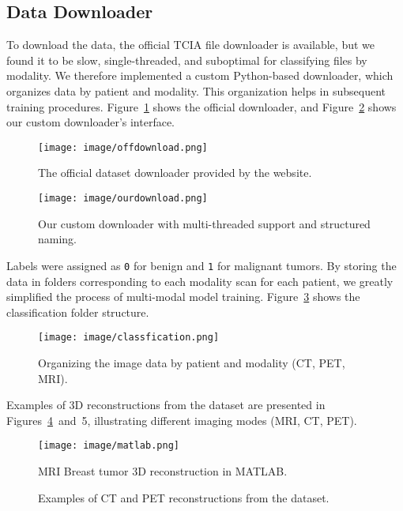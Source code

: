 \documentclass{article}
\begin{document}
\subsection{Data Downloader}
To download the data, the official TCIA file downloader is available, but we found it to be slow, single-threaded, and suboptimal for classifying files by modality. We therefore implemented a custom Python-based downloader, which organizes data by patient and modality. This organization helps in subsequent training procedures. Figure~\ref{fig:odown} shows the official downloader, and Figure~\ref{fig:ourdown} shows our custom downloader’s interface.

\begin{figure}[H]
\centering
\texttt{[image: image/offdownload.png]}
\caption{The official dataset downloader provided by the website.}
\label{fig:odown}
\end{figure}

\begin{figure}[H]
\centering
\texttt{[image: image/ourdownload.png]}
\caption{Our custom downloader with multi-threaded support and structured naming.}
\label{fig:ourdown}
\end{figure}

Labels were assigned as \texttt{0} for benign and \texttt{1} for malignant tumors. By storing the data in folders corresponding to each modality scan for each patient, we greatly simplified the process of multi-modal model training. Figure~\ref{fig:ourclass} shows the classification folder structure.

\begin{figure}[H]
\centering
\texttt{[image: image/classfication.png]}
\caption{Organizing the image data by patient and modality (CT, PET, MRI).}
\label{fig:ourclass}
\end{figure}

Examples of 3D reconstructions from the dataset are presented in Figures~\ref{fig:matlab}~and~5, illustrating different imaging modes (MRI, CT, PET). 

\begin{figure}[H]
\centering
\texttt{[image: image/matlab.png]}
\caption{MRI Breast tumor 3D reconstruction in MATLAB.}
\label{fig:matlab}
\end{figure}

\begin{figure}[H]
    \centering
    \caption{Examples of CT and PET reconstructions from the dataset.}
\end{figure}
\end{document}
